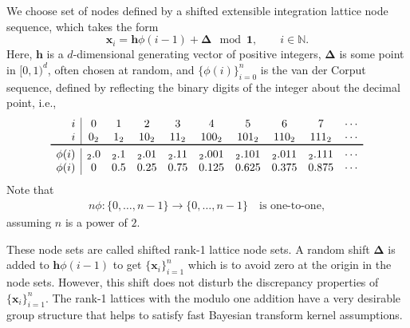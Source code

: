\documentclass{iitthesis}          %
\newcommand{\bm}[1]{\boldsymbol{#1}}
\newcommand{\naturals}{\mathbb{N}}
\newcommand{\vDelta}{{\boldsymbol{\Delta}}}
\newcommand{\vh}{\bm{h}}
\newcommand{\vx}{\bm{x}}
\newcommand{\vone}{\bm{1}}
\begin{document}

We choose set of nodes defined by a shifted extensible integration lattice node sequence, which takes the form
\begin{equation}
\label{eqn:lattice_def}
\vx_{i} = \vh \phi(i-1) + \vDelta \mod \vone, \qquad i \in \naturals.
\end{equation} 
Here, $\vh$ is a $d$-dimensional generating vector of positive integers, $\vDelta$ is some point in $[0,1)^d$, often chosen at random, and $\{\phi(i)\}_{i=0}^n$ is the van der Corput sequence, defined by reflecting the binary digits of the integer about the decimal point, i.e., 
\begin{equation} \label{vdCDef}
\begin{array}{r|ccccccccccccc}
i & 0 & 1 & 2 & 3 & 4 &  5 & 6 & 7 & \cdots \\
i & 0_2 & 1_2 & 10_2 & 11_2 & 100_2 & 101_2 & 110_2 & 111_2  & \cdots\\
\toprule
\phi(i) & {}_2.0 &  {}_2.1 & {}_2.01 &  {}_2.11  & {}_2.001 &  {}_2.101 & {}_2.011 &  {}_2.111 & \cdots\\
\phi(i) & 0 &  0.5 &  0.25 & 0.75 &  0.125 & 0.625  &  0.375 & 0.875 & \cdots
\end{array}
\end{equation}
Note that 
\begin{align} \label{phiprop}
n\phi:\{0, \ldots, n-1 \} \to \{0, \ldots, n-1\} \quad
\text{is one-to-one},
\end{align}
assuming $n$ is a power of $2$.

These node sets are called shifted rank-1 lattice node sets.
A random shift $\vDelta$ is added to $\vh \phi(i-1)$ to get $\{\vx_{i}\}_{i=1}^n$ which is to avoid zero at the origin in the node sets. However, this shift does not disturb the discrepancy properties of $\{\vx_{i}\}_{i=1}^n$. 
The rank-1 lattices with the modulo one addition have a very desirable group structure that helps to satisfy fast Bayesian transform kernel assumptions.
\end{document}

